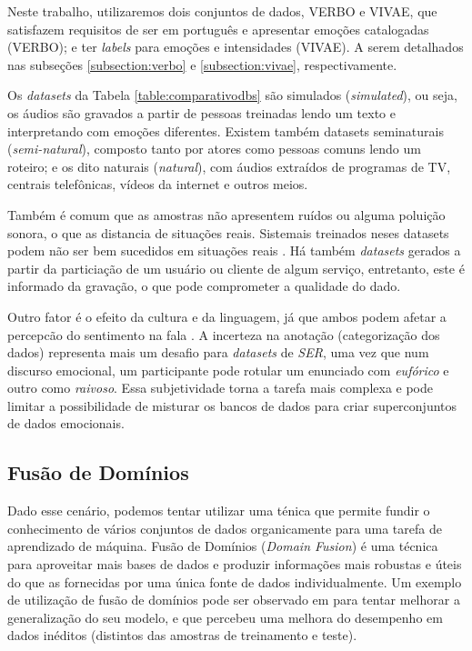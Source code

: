 Neste trabalho, utilizaremos dois conjuntos de dados, VERBO e VIVAE, que satisfazem requisitos de ser em português e apresentar emoções catalogadas (VERBO); e ter \textit{labels} para emoções e intensidades (VIVAE). A serem detalhados nas subseções \ref{subsection:verbo} e \ref{subsection:vivae}, respectivamente.

Os \textit{datasets} da Tabela \ref{table:comparativodbs} são simulados (\textit{simulated}), ou seja, os áudios são gravados a partir de pessoas treinadas lendo um texto e interpretando com emoções diferentes. Existem também datasets seminaturais (\textit{semi-natural}), composto tanto por atores como pessoas comuns lendo um roteiro; e os dito naturais (\textit{natural}), com áudios extraídos de programas de TV, centrais telefônicas, vídeos da internet e outros meios.

Também é comum que as amostras não apresentem ruídos ou alguma poluição sonora, o que as distancia de situações reais. Sistemais treinados neses datasets podem não ser bem sucedidos em situações reais \cite{32}. Há também \textit{datasets} gerados a partir da particiação de um usuário ou cliente de algum serviço, entretanto, este é informado da gravação, o que pode comprometer a qualidade do dado.

Outro fator é o efeito da cultura e da linguagem, já que ambos podem afetar a percepcão do sentimento na fala \cite{32}. A incerteza na anotação (categorização dos dados) representa mais um desafio para \textit{datasets} de \textit{SER}, uma vez que num discurso emocional, um participante pode rotular um enunciado com \textit{eufórico} e outro como \textit{raivoso}. Essa subjetividade torna a tarefa mais complexa e pode limitar a possibilidade de misturar os bancos de dados para criar superconjuntos de dados emocionais.

\subsection{Fusão de Domínios}

Dado esse cenário, podemos tentar utilizar uma ténica que permite fundir o conhecimento de vários conjuntos de dados organicamente para uma tarefa de aprendizado de máquina. Fusão de Domínios \cite{49}(\textit{Domain Fusion}) é uma técnica para aproveitar mais bases de dados e produzir informações mais robustas e úteis do que as fornecidas por uma única fonte de dados individualmente. Um exemplo de utilização de fusão de domínios pode ser observado em \cite{3} para tentar melhorar a generalização do seu modelo, e que percebeu uma melhora do desempenho em dados inéditos (distintos das amostras de treinamento e teste).

